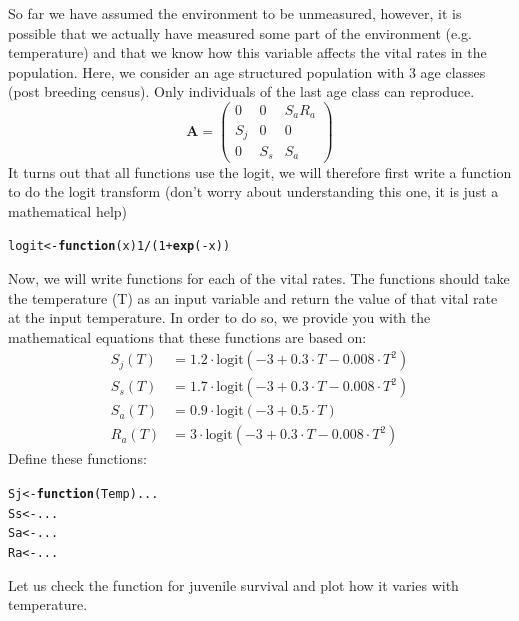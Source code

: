\documentclass{article}\usepackage[]{graphicx}\usepackage[]{color}
\makeatletter
\newcommand{\hlnum}[1]{\textcolor[rgb]{0.686,0.059,0.569}{#1}}%
\newcommand{\hlopt}[1]{\textcolor[rgb]{0,0,0}{#1}}%
\newcommand{\hlstd}[1]{\textcolor[rgb]{0.345,0.345,0.345}{#1}}%
\newcommand{\hlkwa}[1]{\textcolor[rgb]{0.161,0.373,0.58}{\textbf{#1}}}%
\newcommand{\hlkwb}[1]{\textcolor[rgb]{0.69,0.353,0.396}{#1}}%
\newcommand{\hlkwc}[1]{\textcolor[rgb]{0.333,0.667,0.333}{#1}}%
\newcommand{\hlkwd}[1]{\textcolor[rgb]{0.737,0.353,0.396}{\textbf{#1}}}%
\newenvironment{kframe}{%
 \def\at@end@of@kframe{}%
 \ifinner\ifhmode%
  \def\at@end@of@kframe{\end{minipage}}%
  \begin{minipage}{\columnwidth}%
 \fi\fi%
 \def\FrameCommand##1{\hskip\@totalleftmargin \hskip-\fboxsep
 \colorbox{shadecolor}{##1}\hskip-\fboxsep
     \hskip-\linewidth \hskip-\@totalleftmargin \hskip\columnwidth}%
 \MakeFramed {\advance\hsize-\width
   \@totalleftmargin\z@ \linewidth\hsize
   \@setminipage}}%
 {\par\unskip\endMakeFramed%
 \at@end@of@kframe}
\newenvironment{knitrout}{}{} %
\makeatother
\begin{document}
So far we have assumed the environment to be unmeasured, however, it is possible that we actually have measured some part of the environment (e.g. temperature) and that we know how this variable affects the vital rates in the population. Here, we consider an age structured population with 3 age classes (post breeding census). Only individuals of the last age class can reproduce.
\begin{equation*}
\boldsymbol{A} = \begin{pmatrix} 0 & 0 & S_a R_a \\
S_j & 0 & 0 \\
0 & S_s & S_a\end{pmatrix}
\end{equation*}
It turns out that all functions use the logit, we will therefore first write a function to do the logit transform (don't worry about understanding this one, it is just a mathematical help)
\begin{knitrout}
\color{fgcolor}\begin{kframe}
\begin{alltt}
\hlstd{logit} \hlkwb{<-} \hlkwa{function}\hlstd{(}\hlkwc{x}\hlstd{)} \hlnum{1}\hlopt{/}\hlstd{(}\hlnum{1}\hlopt{+}\hlkwd{exp}\hlstd{(}\hlopt{-}\hlstd{x))}
\end{alltt}
\end{kframe}
\end{knitrout}
Now, we will write functions for each of the vital rates. The functions should take the temperature (T) as an input variable and return the value of that vital rate at the input temperature. In order to do so, we provide you with the mathematical equations that these functions are based on:
\begin{align*}
S_j (T) & = 1.2\cdot \text{logit}(-3 + 0.3\cdot T - 0.008\cdot T^2)\\
S_s (T) & = 1.7\cdot \text{logit}(-3 + 0.3\cdot T - 0.008\cdot T^2)\\
S_a (T) & = 0.9\cdot \text{logit}(-3 + 0.5\cdot T)\\
R_a(T) & = 3\cdot \text{logit}(-3 + 0.3\cdot T - 0.008\cdot T^2)
\end{align*}
Define these functions:
\begin{knitrout}
\color{fgcolor}\begin{kframe}
\begin{alltt}
\hlstd{Sj} \hlkwb{<-} \hlkwa{function}\hlstd{(}\hlkwc{Temp}\hlstd{) ...}
\hlstd{Ss} \hlkwb{<-} \hlstd{...}
\hlstd{Sa} \hlkwb{<-} \hlstd{...}
\hlstd{Ra} \hlkwb{<-} \hlstd{...}
\end{alltt}
\end{kframe}
\end{knitrout}
Let us check the function for juvenile survival and plot how it varies with temperature.
\end{document}
